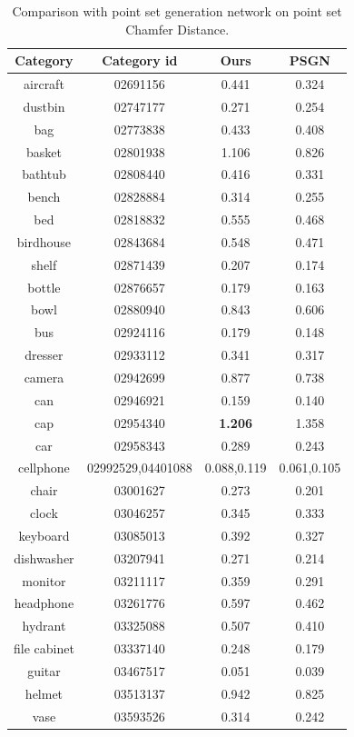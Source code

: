 \begin{table}
	\centering
	\caption{Comparison with point set generation network on point set Chamfer Distance. }
	\begin{tabular}{c c c c}
		Category & Category id & Ours & PSGN\cite{PSGN} \\
		\hline
		aircraft & 02691156 & 0.441 & 0.324\\   
		dustbin & 02747177 & 0.271 & 0.254\\
		bag & 02773838  & 0.433 &  0.408\\
		basket & 02801938 & 1.106 & 0.826\\
		bathtub & 02808440 & 0.416 & 0.331\\
		bench & 02828884 & 0.314 & 0.255\\
		bed & 02818832 & 0.555 & 0.468\\
		birdhouse & 02843684 & 0.548 & 0.471\\
		shelf & 02871439 & 0.207 & 0.174\\
		bottle & 02876657 & 0.179 & 0.163\\
		bowl & 02880940 & 0.843 & 0.606\\
		bus & 02924116 & 0.179 & 0.148\\
		dresser & 02933112 & 0.341 & 0.317\\
		camera & 02942699 & 0.877 & 0.738\\
		can & 02946921 & 0.159 & 0.140\\
		cap & 02954340 & {\color{green} \textbf{1.206}} & 1.358\\
		car & 02958343 & 0.289 & 0.243\\
		cellphone & 02992529,04401088 & 0.088,0.119 & 0.061,0.105\\
		chair & 03001627 & 0.273 & 0.201\\
		clock & 03046257 & 0.345 & 0.333\\
		keyboard & 03085013 & 0.392 & 0.327\\
		dishwasher & 03207941 & 0.271 & 0.214\\
		monitor & 03211117 & 0.359 & 0.291\\
		headphone & 03261776 & 0.597 & 0.462\\
		hydrant & 03325088 & 0.507 & 0.410\\
		file cabinet& 03337140 & 0.248 & 0.179\\
		guitar & 03467517 & 0.051 & 0.039\\
		helmet & 03513137 & 0.942 & 0.825\\
		vase & 03593526 & 0.314 & 0.242\\

\end{tabular}
\end{table}
